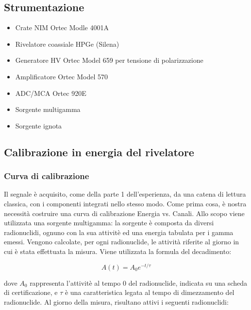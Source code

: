 \documentclass[a4paper,10pt]{article}
\begin{document}

\subsection{Strumentazione}
\begin{itemize}
\item Crate NIM Ortec Modle 4001A
\item Rivelatore coassiale HPGe (Silena)
\item Generatore HV Ortec Model 659 per tensione di polarizzazione
\item Amplificatore Ortec Model 570
\item ADC/MCA Ortec 920E
\item Sorgente multigamma
\item Sorgente ignota
\end{itemize}
\subsection{Calibrazione in energia del rivelatore}

 
\subsubsection{Curva di calibrazione}
Il segnale \`e acquisito, come della parte 1 dell'esperienza, da una catena di lettura classica, con i componenti integrati nello stesso modo. Come prima cosa, \`e nostra necessit\`a costruire una curva di calibrazione Energia vs. Canali. Allo scopo viene utilizzata una sorgente multigamma: la sorgente \`e composta da diversi radionuclidi, ognuno con la sua attivit\`e ed una energia tabulata per i gamma emessi. Vengono calcolate, per ogni radionuclide, le attività riferite al giorno in cui \`e stata effettuata la misura. Viene utilizzata la formula del decadimento:

\begin{equation}
	A(t)=A_{0}e^{-t/\tau}
\end{equation}

\noindent dove $A_{0}$ rappresenta l'attivit\`e al tempo 0 del radionuclide, indicata su una scheda di certificazione, e $\tau$ \`e una caratteristica legata al tempo di dimezzamento del radionuclide. Al giorno della misura, risultano attivi i seguenti radionuclidi:
\end{document}

